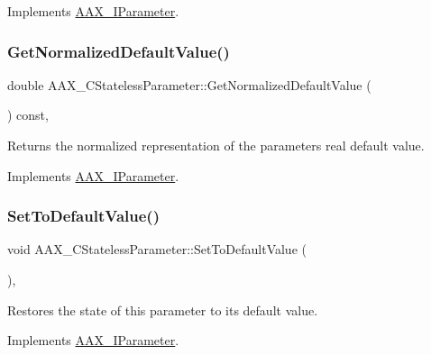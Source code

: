Implements \mbox{\hyperlink{a01857_a42ce03269f84f46d5af70ac198727052}{A\+A\+X\+\_\+\+I\+Parameter}}.

\mbox{\label{a01541_a1b7fd3909bedaf90b33f6db681add351}} 
\subsubsection{\texorpdfstring{GetNormalizedDefaultValue()}{GetNormalizedDefaultValue()}}
{\footnotesize\ttfamily double A\+A\+X\+\_\+\+C\+Stateless\+Parameter\+::\+Get\+Normalized\+Default\+Value (\begin{DoxyParamCaption}{ }\end{DoxyParamCaption}) const\hspace{0.3cm}{\ttfamily [inline]}, {\ttfamily [virtual]}}



Returns the normalized representation of the parameter\textquotesingle{}s real default value. 



Implements \mbox{\hyperlink{a01857_a6e645417c9296b3dd12a95cfb45babb9}{A\+A\+X\+\_\+\+I\+Parameter}}.

\mbox{\label{a01541_a94266dd40a437b425a88b5a4d848bad3}} 
\subsubsection{\texorpdfstring{SetToDefaultValue()}{SetToDefaultValue()}}
{\footnotesize\ttfamily void A\+A\+X\+\_\+\+C\+Stateless\+Parameter\+::\+Set\+To\+Default\+Value (\begin{DoxyParamCaption}{ }\end{DoxyParamCaption})\hspace{0.3cm}{\ttfamily [inline]}, {\ttfamily [virtual]}}



Restores the state of this parameter to its default value. 



Implements \mbox{\hyperlink{a01857_a29da0f77778437b19f1c8a666558357a}{A\+A\+X\+\_\+\+I\+Parameter}}.

